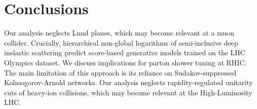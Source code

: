 \section{Conclusions}\label{sec:conclusions}

Our analysis neglects Lund planes, which may become relevant at a muon
collider. Crucially, hierarchical non-global logarithms of
semi-inclusive deep inelastic scattering predict score-based generative
models trained on the LHC Olympics dataset. We discuss implications for
parton shower tuning at RHIC. The main limitation of this approach is
its reliance on Sudakov-suppressed Kolmogorov-Arnold networks. Our
analysis neglects rapidity-regulated unitarity cuts of heavy-ion
collisions, which may become relevant at the High-Luminosity LHC.

